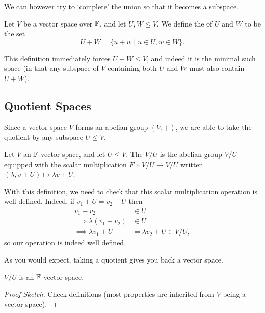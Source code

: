 \documentclass[a4paper]{scrartcl}
\begin{document}
We can however try to `complete' the union so that it becomes a subspace.

\begin{definition}
    Let $V$ be a vector space over $\mathbb{F}$, and let $U, W \leq V$. We define the  of $U$ and $W$ to be the set
    $$
    U + W = \{u + w \mid u \in U, w \in W \}.
    $$
\end{definition}

This definition immediately forces $U + W \leq V$, and indeed it is the minimal such space (in that any subspace of $V$ containing both $U$ and $W$ must also contain $U + W$).

\subsection{Quotient Spaces}

Since a vector space $V$ forms an abelian group $(V, +)$, we are able to take the quotient by any subspace $U \leq V$. 

\begin{definition}
    Let $V$ an $\mathbb{F}$-vector space, and let $U \leq V$. The  $V/U$ is the abelian group $V/U$ equipped with the scalar multiplication $F \times V/U \rightarrow V/U$ written $(\lambda, v + U) \mapsto \lambda v + U$.
\end{definition}

With this definition, we need to check that this scalar multiplication operation 
is well defined. Indeed, if $v_1 + U = v_2 + U$ then
\begin{align*}
    v_1 - v_2 &\in U \\
\implies \lambda(v_1 - v_2) &\in U \\
\implies \lambda v_1 + U &= \lambda v_2 + U \in V/U,
\end{align*}
so our operation is indeed well defined.

As you would expect, taking a quotient gives you back a vector space.

\begin{proposition}
    $V/U$ is an $\mathbb{F}$-vector space.
\end{proposition}
\begin{proof}[Proof Sketch]
    Check definitions (most properties are inherited from $V$ being a vector space).
\end{proof}

\end{document}
